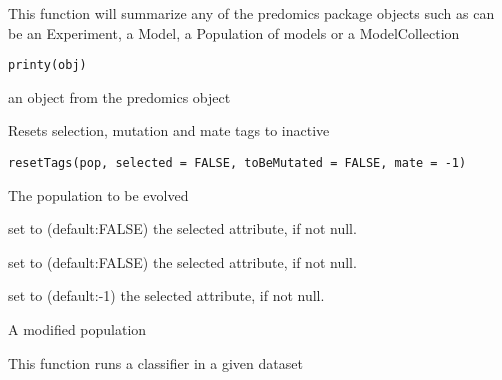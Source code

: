 \documentclass[a4paper]{book}
\begin{document}
%
\begin{Description}
This function will summarize any of the predomics package objects such as can be an Experiment, 
a Model, a Population of models or a ModelCollection
\end{Description}
%
\begin{Usage}
\begin{verbatim}
printy(obj)
\end{verbatim}
\end{Usage}
%
\begin{Arguments}
\begin{ldescription}
\item[\code{obj:}] an object from the predomics object
\end{ldescription}
\end{Arguments}
%
\begin{Description}
Resets selection, mutation and mate tags to inactive
\end{Description}
%
\begin{Usage}
\begin{verbatim}
resetTags(pop, selected = FALSE, toBeMutated = FALSE, mate = -1)
\end{verbatim}
\end{Usage}
%
\begin{Arguments}
\begin{ldescription}
\item[\code{pop:}] The population to be evolved

\item[\code{selected:}] set to (default:FALSE) the selected attribute, if not null.

\item[\code{toBeMutated:}] set to (default:FALSE) the selected attribute, if not null.

\item[\code{mate:}] set to (default:-1) the selected attribute, if not null.
\end{ldescription}
\end{Arguments}
%
\begin{Value}
A modified population
\end{Value}
%
\begin{Description}
This function runs a classifier in a given dataset
\end{Description}
\end{document}
